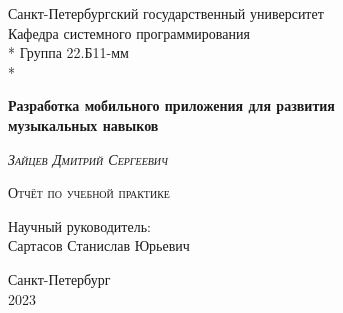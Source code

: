 \begin{titlepage}
\newpage

\begin{center}
Санкт-Петербургский государственный университет \\
\vspace{1cm}
Кафедра системного программирования \\*
Группа 22.Б11-мм \\*
\hrulefill
\end{center}

\vspace{8em}

\begin{center}
\Large \textbf{Разработка мобильного приложения для развития\\музыкальных навыков}
\end{center}

\vspace{2.5em}

\begin{center}
\LARGE \textsc{\textit{Зайцев Дмитрий Сергеевич }}
\end{center}

\begin{center}
\textsc{Отчёт по учебной практике}
\end{center}

\vspace{6em}

\begin{flushright}
Научный руководитель:\\
Сартасов Станислав Юрьевич
\end{flushright}

\vspace{\fill}

\begin{center}
Санкт-Петербург\\2023
\end{center}

\end{titlepage}